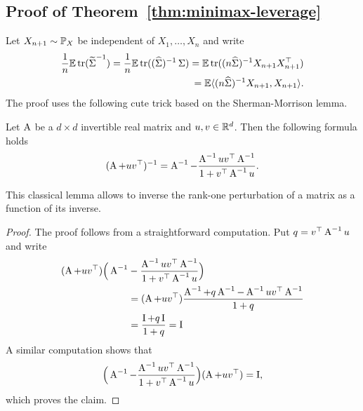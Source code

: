\subsection{Proof of Theorem~\ref{thm:minimax-leverage}} %


Let $X_{n+1} \sim \P_X$ be independent of $X_1, \ldots, X_n$ and write
\begin{align*}
	\frac 1n \E \tr( \wt \bSigma^{-1}) 
	= \frac 1n \E \tr( (\wh \bSigma)^{-1} \bSigma) 
	= \E \tr( (n \wh \bSigma)^{-1} X_{n+1} X_{n+1}^\top) \\
	= \E \inr{(n \wh \bSigma)^{-1} X_{n+1}, X_{n+1}}.
\end{align*}
The proof uses the following cute trick based on the Sherman-Morrison lemma.

\begin{lemma}
	\label{lem:sherman-morrison}
	Let $\bA$ be a $d \times d$ invertible real matrix and $u, v \in \R^d$. Then the following formula holds
	\begin{equation*}
		(\bA + u v^\top)^{-1} = \bA^{-1} - \frac{\bA^{-1} u v^\top \bA^{-1} }{1 + v^\top \bA^{-1} u}.
	\end{equation*}
\end{lemma}
This classical lemma allows to inverse the rank-one perturbation of a matrix as a function of its inverse.
\begin{proof}
	The proof follows from a straightforward computation.
	Put $q = v^\top \bA^{-1} u$ and write
	\begin{align*}
	(\bA + u v^\top) \Big( \bA^{-1} &- \frac{\bA^{-1} u v^\top \bA^{-1}}{1 + v^\top \bA^{-1} u} \Big) \\
	& = (\bA + u v^\top) \frac{\bA^{-1} + q \bA^{-1} - \bA^{-1} u v^\top \bA^{-1}}{1 + q} \\
	&= \frac{\bI + q \bI}{1 + q} = \bI
	\end{align*}
	A similar computation shows that 
	\begin{equation*}
		\Big( \bA^{-1} - \frac{\bA^{-1} u v^\top \bA^{-1} }{1 + v^\top \bA^{-1} u} \Big) 
		(\bA + u v^\top) = \bI,
	\end{equation*}
	which proves the claim.
\end{proof}

